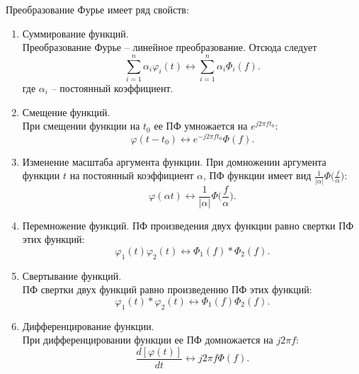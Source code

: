 \documentclass[a4paper,14pt]{extarticle}
\begin{document}
Преобразование Фурье имеет ряд свойств:

\begin{enumerate}

\item Суммирование функций. \\ Преобразование Фурье -- линейное преобразование. Отсюда следует 
\begin{equation*}
\sum_{i=1}^n \alpha_i \varphi_i (t) \leftrightarrow  \sum_{i=1}^n \alpha_i \Phi_i (f).
\end{equation*}   
где $\alpha_i$ -- постоянный коэффициент.

\item Смещение функций. \\ При смещении функции на $t_0$ ее ПФ умножается на $e^{j 2 \pi f t_0}$:
\begin{equation*}
\varphi (t - t_0) \leftrightarrow e^{-j 2 \pi f t_0} \Phi (f).
\end{equation*}

\item Изменение масштаба аргумента функции.
При домножении аргумента функции $t$ на постоянный коэффициент $\alpha$, ПФ функции имеет вид $\frac{1}{|\alpha|} \Phi \big(\frac{f}{\alpha}\big)$:
\begin{equation*}
\varphi(\alpha t) \leftrightarrow \frac{1}{|\alpha|} \Phi \bigg(\frac{f}{\alpha}\bigg).
\end{equation*}

\item Перемножение функций.  ПФ произведения двух функции равно свертки ПФ этих функций:
\begin{equation*}
\varphi_1 (t) \varphi_2 (t) \leftrightarrow \Phi_1(f) * \Phi_2(f). 
\end{equation*}

\item Свертывание функций. \\ ПФ свертки двух функций равно произведению ПФ этих функций:
\begin{equation*}
\varphi_1(t) * \varphi_2(t) \leftrightarrow  \Phi_1(f)  \Phi_2(f).
\end{equation*}

\item Дифференцирование функции. \\ При дифференцировании функции ее ПФ домножается на $j 2 \pi f$:
\begin{equation*}
\frac{d[\varphi(t)]}{dt} \leftrightarrow j 2 \pi f \Phi (f).
\end{equation*}


\end{enumerate}
\end{document}

